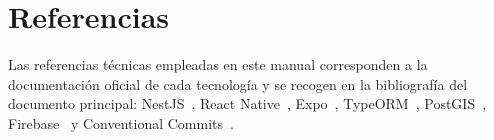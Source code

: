 \section{Referencias}

Las referencias técnicas empleadas en este manual corresponden a la documentación oficial de cada tecnología y se recogen en la bibliografía del documento principal: NestJS~\cite{nestjs}, React Native~\cite{reactnative}, Expo~\cite{expo}, TypeORM~\cite{typeorm}, PostGIS~\cite{postgisdocs}, Firebase~\cite{firebase} y Conventional Commits~\cite{conventionalcommits}.
